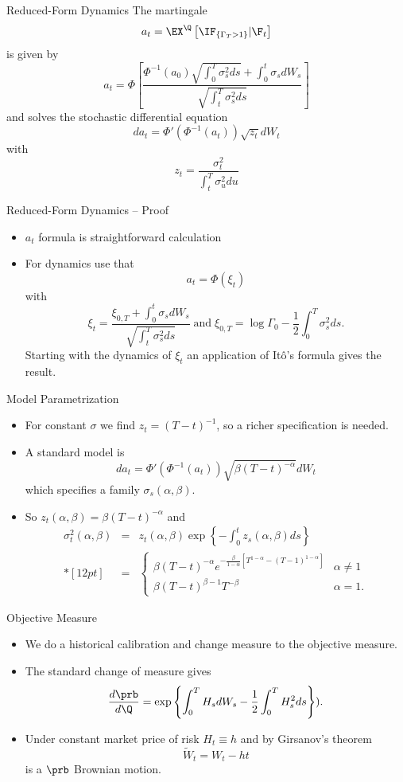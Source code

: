 {Reduced-Form Dynamics}
The martingale
$$
a_t = \EX^\Q\left[\IF_{\{\Gamma_T>1\}} |\F_t\right]
$$
is given by
$$
a_t= \Phi \left[\frac{\Phi^{-1}(a_0) \sqrt{\int_0^T \sigma^2_s ds}+\int_0^t \sigma_s dW_s}{\sqrt{\int_t^T \sigma^2_s ds}}\right]
$$
and solves the stochastic differential equation
$$
da_t = \Phi'\left(\Phi^{-1}(a_t)\right)\sqrt{z_t}dW_t
$$
with
$$
z_t=\frac{\sigma_t^2}{\int_t^T \sigma^2_u du}
$$


{Reduced-Form Dynamics -- Proof}
\begin{itemize}
\item<1-> $a_t$ formula is straightforward calculation
\item<2-> For dynamics use that
$$
a_t = \Phi(\xi_t)
$$
with
$$
\xi_t = \frac{\xi_{0,T}+\int_0^t\sigma_s dW_s}{\sqrt{\int_t^T\sigma_s^2ds}}\; \mbox{and}\;  \xi_{0,T}=\log \Gamma_0 - \frac{1}{2} \int_0^T\sigma_s^2ds.
$$
Starting with the dynamics of $\xi_t$ an application of It{\^o}'s formula gives the result.
\end{itemize}



{Model Parametrization}
\begin{itemize}
\item<1-> For constant $\sigma$ we find $z_t=(T-t)^{-1}$, so a richer specification is needed.
\item<2-> A standard model is
$$
da_t = \Phi'\left(\Phi^{-1}(a_t)\right)\sqrt{\beta(T-t)^{-\alpha}}dW_t
$$
which specifies a family $\sigma_s(\alpha,\beta)$.
\item<3->
So $z_t(\alpha, \beta) = \beta(T-t)^{-\alpha}$ and
$$
\begin{array}{lll}
\sigma_t^2(\alpha,\beta)&=& \displaystyle z_t(\alpha, \beta) \exp\left\{-\int_0^t z_s(\alpha, \beta) ds \right\}\\*[12pt]
&=&\displaystyle
\left\{
\begin{array}{ll}
\beta(T-t)^{-\alpha} e^{-\frac{\beta}{1-\alpha}[T^{1-\alpha}-(T-1)^{1-\alpha}]} &\alpha \not=1\\
\beta(T-t)^{\beta-1}T^{-\beta} &\alpha=1.
\end{array}
\right.
\end{array}
$$
\end{itemize}


{Objective Measure}
\begin{itemize}
\item<1-> We do a historical calibration and change measure to the objective measure.
\item<2-> The standard change of measure gives
$$
\frac{d\prb}{d\Q} = \exp\left\{\int_0^T H_s dW_s -\frac{1}{2} \int_0^T H_s^2ds \right\}).
$$
\item<3->
Under constant market price of risk $H_t \equiv h$ and by Girsanov's theorem
$$
\tilde{W}_t = W_t - ht
$$
is a $\prb$ Brownian motion.
\end{itemize}


